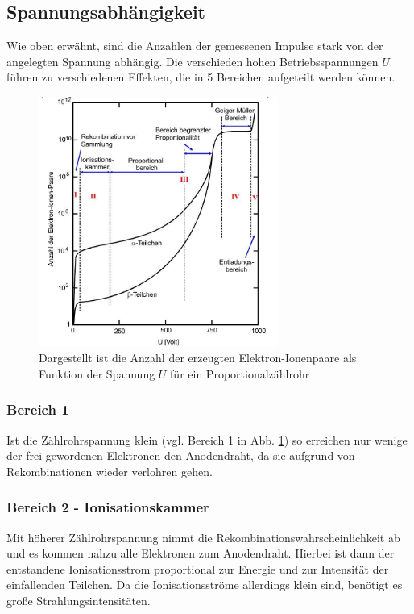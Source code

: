 \subsection{Spannungsabhängigkeit}
Wie oben erwähnt, sind die Anzahlen der gemessenen Impulse stark von 
der angelegten Spannung abhängig. Die verschieden hohen Betriebsspannungen $U$ 
führen zu verschiedenen Effekten, die in 5 Bereichen aufgeteilt werden können.

\begin{figure}
    \centering
    \includegraphics[width=0.7\textwidth]{input/bereiche.jpg}
    \caption{Dargestellt ist die Anzahl der erzeugten Elektron-Ionenpaare als Funktion der Spannung $U$
    für ein Proportionalzählrohr\cite[221]{anleitung}}
    \label{fig:bereiche}
\end{figure}
\subsubsection*{Bereich 1}
Ist die Zählrohrspannung klein (vgl. Bereich 1 in Abb. \ref{fig:bereiche})
so erreichen nur wenige der frei gewordenen Elektronen den Anodendraht, da 
sie aufgrund von Rekombinationen wieder verlohren gehen.
\subsubsection*{Bereich 2 - Ionisationskammer}
Mit höherer Zählrohrspannung nimmt die Rekombinationswahrscheinlichkeit ab und
es kommen nahzu alle Elektronen zum Anodendraht. Hierbei ist dann der entstandene
Ionisationsstrom proportional zur Energie und zur Intensität der einfallenden Teilchen.
Da die Ionisationsströme allerdings klein sind, benötigt es große Strahlungsintensitäten.
